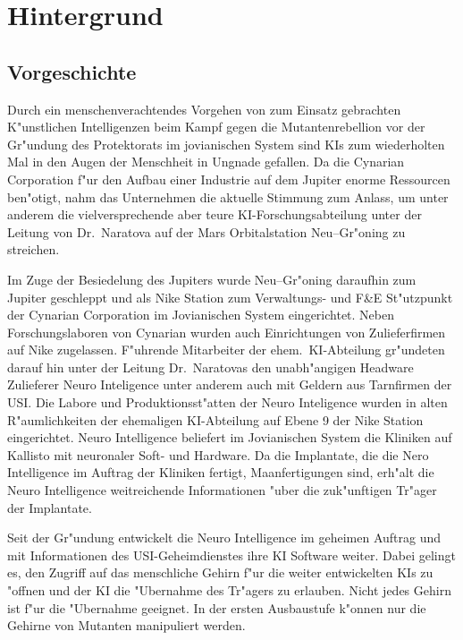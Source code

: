 \section{Hintergrund}

\subsection{Vorgeschichte}

Durch ein menschenverachtendes Vorgehen von zum Einsatz gebrachten K"unstlichen Intelligenzen beim Kampf gegen die Mutantenrebellion vor der Gr"undung des Protektorats im jovianischen System sind KIs zum wiederholten Mal in den Augen der Menschheit in Ungnade gefallen. Da die Cynarian Corporation f"ur den Aufbau einer Industrie auf dem Jupiter enorme Ressourcen ben"otigt, nahm das Unternehmen die aktuelle Stimmung zum Anlass, um unter anderem die vielversprechende aber teure KI-Forschungsabteilung unter der Leitung von Dr.~Naratova auf der Mars Orbitalstation Neu--Gr"oning zu streichen.

Im Zuge der Besiedelung des Jupiters wurde Neu--Gr"oning daraufhin zum Jupiter geschleppt und als Nike Station zum Verwaltungs- und F\&E St"utzpunkt der Cynarian Corporation im Jovianischen System eingerichtet. Neben Forschungslaboren von Cynarian wurden auch Einrichtungen von Zulieferfirmen auf Nike zugelassen. F"uhrende Mitarbeiter der ehem.~KI-Abteilung gr"undeten darauf hin unter der Leitung Dr.~Naratovas den unabh"angigen Headware Zulieferer Neuro Inteligence unter anderem auch mit Geldern aus Tarnfirmen der USI. Die Labore und Produktionsst"atten der Neuro Inteligence wurden in alten R"aumlichkeiten der ehemaligen KI-Abteilung auf Ebene 9 der Nike Station eingerichtet. Neuro Intelligence beliefert im Jovianischen System die Kliniken auf Kallisto mit neuronaler Soft- und Hardware. Da die Implantate, die die Nero Intelligence im Auftrag der Kliniken fertigt, Ma\3anfertigungen sind, erh"alt die Neuro Intelligence weitreichende Informationen "uber die zuk"unftigen Tr"ager der Implantate.

Seit der Gr"undung entwickelt die Neuro Intelligence im geheimen Auftrag und mit Informationen des USI-Geheimdienstes ihre KI Software weiter. Dabei gelingt es, den Zugriff auf das menschliche Gehirn f"ur die weiter entwickelten KIs zu "offnen und der KI die "Ubernahme des Tr"agers zu erlauben. Nicht jedes Gehirn ist f"ur die "Ubernahme geeignet. In der ersten Ausbaustufe k"onnen nur die Gehirne von Mutanten manipuliert werden.

